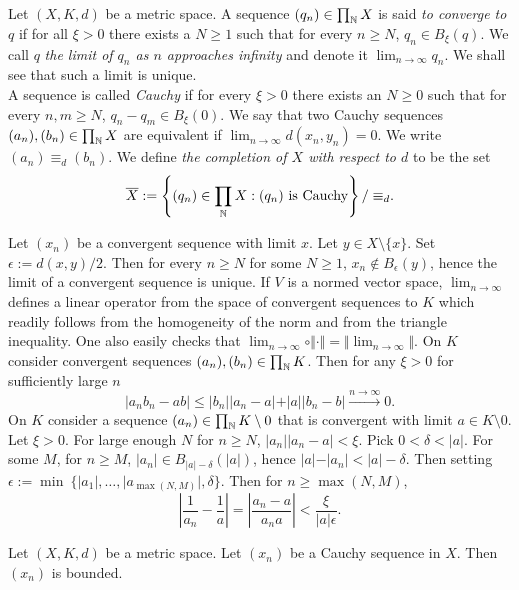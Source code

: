     \begin{definition}
        Let $(X,K,d)$ be a metric space. A sequence $(q_n)\in \prod_{\mathbb{N}} X$ is said \textit{to converge to $q$} if for all $\xi>0$ there exists a $N\geq 1$ such that for every $n\geq N$, $q_n\in B_\xi(q)$. We call $q$ \textit{the limit of $q_n$ as $n$ approaches infinity} and denote it $\lim_{n\to \infty} q_n$. We shall see that such a limit is unique.\\
        A sequence is called \textit{Cauchy} if for every $\xi>0$ there exists an $N\geq 0$ such that for every $n,m\geq N$, $q_n-q_m\in B_\xi(0)$. We say that two Cauchy sequences $(a_n),(b_n)\in \prod_{\mathbb{N}} X$ are equivalent if $\lim_{n\to \infty} d(x_n,y_n)=0$. We write $(a_n)\equiv_d (b_n)$. We define \textit{the completion of $X$ with respect to $d$} to be the set $$\overline{X} := \left\{(q_n)\in \prod_{\mathbb{N}} X: (q_n) \text{ is Cauchy}\right\}{/ \equiv_d}.$$   
    \end{definition}
    \begin{remark}\label{sequentialCont}
        Let $(x_n)$ be a convergent sequence with limit $x$. Let $y\in X\setminus \{x\}$. Set $\epsilon:= d(x,y)/2$. Then for every $n\geq N$ for some $N\geq 1$, $x_n\notin B_\epsilon(y)$, hence the limit of a convergent sequence is unique. If $V$ is a normed vector space, $\lim_{n\to \infty}$ defines a linear operator from the space of convergent sequences to $K$ which readily follows from the homogeneity of the norm and from the triangle inequality. One also easily checks that $\lim_{n\to \infty} \circ \Vert \cdot\Vert = \Vert \lim_{n\to\infty}\Vert$. On $K$ consider convergent sequences $(a_n),(b_n)\in \prod_{\mathbb{N}} K$. Then for any $\xi>0$ for sufficiently large $n$
        $$\vert a_nb_n-ab\vert \leq \vert b_n\vert\vert a_n-a\vert+\vert a\vert \vert b_n-b\vert \overset{n\to \infty}{\to} 0.$$
        On $K$ consider a sequence $(a_n)\in \prod_{\mathbb{N}} K\setminus 0$ that is convergent with limit $a\in K\setminus 0$. Let $\xi>0$. For large enough $N$ for $n\geq N$, $\vert a_n\vert \vert a_n-a\vert < \xi $. Pick $0<\delta< \vert a\vert$. For some $M$, for $n\geq M$, $\vert a_n\vert \in B_{\vert a\vert -\delta}(\vert a\vert)$, hence $\vert a\vert -\vert a_n\vert< \vert a\vert -\delta$. Then setting $\epsilon:= \min\ \{\vert a_1\vert,\dots,\vert a_{\max(N,M)}\vert,\delta\}$. Then for $n\geq\max(N,M)$, 
        $$\left\vert \frac{1}{a_n}-\frac{1}{a}\right\vert =\left\vert \frac{a_n-a}{a_na}\right\vert <\frac{\xi}{\vert a\vert\epsilon}.$$
    \end{remark}
    \begin{lemma}\label{CauchySequencesAreBounded}
        Let $(X,K,d)$ be a metric space. Let $(x_n)$ be a Cauchy sequence in $X$. Then $(x_n)$ is bounded.
    \end{lemma}
